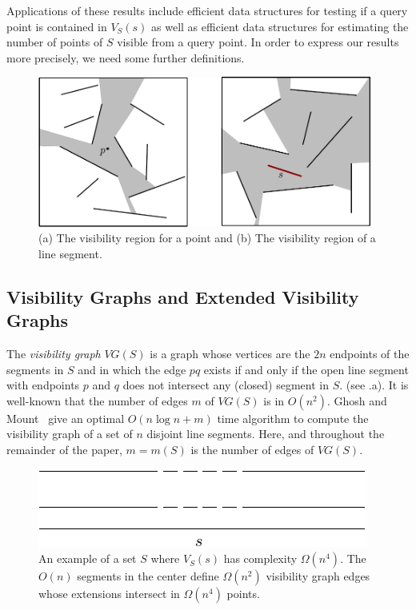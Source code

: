 \documentclass{patmorin}
\newcommand{\VG}{\mathit{VG}}
\begin{document}
Applications of these results include efficient data structures for
testing if a query point is contained in $V_S(s)$ as well as efficient
data structures for estimating the number of points of $S$ visible
from a query point.  In order to express our results more precisely,
we need some further definitions.


\begin{figure}
  \begin{center}
    \includegraphics[width=11cm]{VizRegion2}
    \caption{(a) The visibility region for a point and (b) The visibility region of a line segment.}
  \end{center}
\end{figure}

\subsection{Visibility Graphs and Extended Visibility Graphs}

The \emph{visibility graph} $\VG(S)$ is a graph whose vertices are the
$2n$ endpoints of the segments in $S$ and in which the edge $pq$ exists
if and only if the open line segment with endpoints $p$ and $q$ does
not intersect any (closed) segment in $S$. (see .a).
It is well-known that the number of edges $m$ of $\VG(S)$ is in $O(n^2)$.
Ghosh and Mount~\cite{gm91} give an optimal $O(n\log n+ m)$
time algorithm to compute the visibility graph of a set of $n$ disjoint
line segments.  Here, and throughout the remainder of the paper, $m=m(S)$
is the number of edges of $\VG(S)$.

\begin{figure}
  \begin{center}
    \includegraphics{quartic}
  \end{center}
  \caption{An example of a set $S$ where $V_S(s)$ has complexity
   $\Omega(n^4)$. The $O(n)$ segments in the center define $\Omega(n^2)$
   visibility graph edges whose extensions intersect in $\Omega(n^4)$ points.}
\end{figure}
\end{document}

